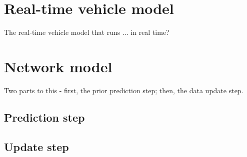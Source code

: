 \documentclass[times, doublespace]{anzsauth}
\begin{document}
\section{Real-time vehicle model}
\label{sec:pf}

The real-time vehicle model that runs ... in real time?


\section{Network model}
\label{sec:kf}

Two parts to this - first, the prior prediction step; then, the data update step.

\subsection{Prediction step}
\label{sec:kf-pred}



\subsection{Update step}
\label{sec:kf-update}






\end{document}
